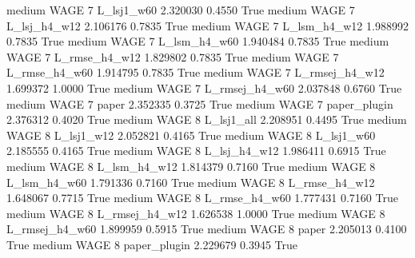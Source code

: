     medium     WAGE                 7     L_lsj1_w60   2.320030      0.4550    True
    medium     WAGE                 7   L_lsj_h4_w12   2.106176      0.7835    True
    medium     WAGE                 7   L_lsm_h4_w12   1.988992      0.7835    True
    medium     WAGE                 7   L_lsm_h4_w60   1.940484      0.7835    True
    medium     WAGE                 7  L_rmse_h4_w12   1.829802      0.7835    True
    medium     WAGE                 7  L_rmse_h4_w60   1.914795      0.7835    True
    medium     WAGE                 7 L_rmsej_h4_w12   1.699372      1.0000    True
    medium     WAGE                 7 L_rmsej_h4_w60   2.037848      0.6760    True
    medium     WAGE                 7          paper   2.352335      0.3725    True
    medium     WAGE                 7   paper_plugin   2.376312      0.4020    True
    medium     WAGE                 8     L_lsj1_all   2.208951      0.4495    True
    medium     WAGE                 8     L_lsj1_w12   2.052821      0.4165    True
    medium     WAGE                 8     L_lsj1_w60   2.185555      0.4165    True
    medium     WAGE                 8   L_lsj_h4_w12   1.986411      0.6915    True
    medium     WAGE                 8   L_lsm_h4_w12   1.814379      0.7160    True
    medium     WAGE                 8   L_lsm_h4_w60   1.791336      0.7160    True
    medium     WAGE                 8  L_rmse_h4_w12   1.648067      0.7715    True
    medium     WAGE                 8  L_rmse_h4_w60   1.777431      0.7160    True
    medium     WAGE                 8 L_rmsej_h4_w12   1.626538      1.0000    True
    medium     WAGE                 8 L_rmsej_h4_w60   1.899959      0.5915    True
    medium     WAGE                 8          paper   2.205013      0.4100    True
    medium     WAGE                 8   paper_plugin   2.229679      0.3945    True